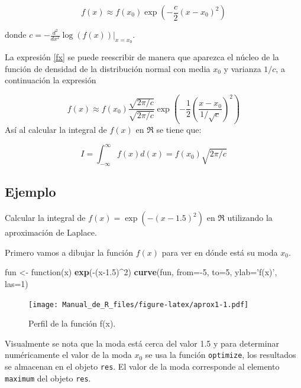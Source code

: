 \documentclass[10pt,]{krantz}
\makeatletter
\newenvironment{Shaded}{\begin{snugshade}}{\end{snugshade}}
\newcommand{\KeywordTok}[1]{\textcolor[rgb]{0.13,0.29,0.53}{\textbf{{#1}}}}
\newcommand{\DataTypeTok}[1]{\textcolor[rgb]{0.13,0.29,0.53}{{#1}}}
\newcommand{\DecValTok}[1]{\textcolor[rgb]{0.00,0.00,0.81}{{#1}}}
\newcommand{\FloatTok}[1]{\textcolor[rgb]{0.00,0.00,0.81}{{#1}}}
\newcommand{\StringTok}[1]{\textcolor[rgb]{0.31,0.60,0.02}{{#1}}}
\newcommand{\NormalTok}[1]{{#1}}
\newenvironment{kframe}{%
\medskip{}
\setlength{\fboxsep}{.8em}
 \def\at@end@of@kframe{}%
 \ifinner\ifhmode%
  \def\at@end@of@kframe{\end{minipage}}%
  \begin{minipage}{\columnwidth}%
 \fi\fi%
 \def\FrameCommand##1{\hskip\@totalleftmargin \hskip-\fboxsep
 \colorbox{shadecolor}{##1}\hskip-\fboxsep
     \hskip-\linewidth \hskip-\@totalleftmargin \hskip\columnwidth}%
 \MakeFramed {\advance\hsize-\width
   \@totalleftmargin\z@ \linewidth\hsize
   \@setminipage}}%
 {\par\unskip\endMakeFramed%
 \at@end@of@kframe}
\renewenvironment{Shaded}{\begin{kframe}}{\end{kframe}}
\makeatother
\begin{document}
\begin{equation} \label{fx}
f(x) \approx f(x_0)  \exp \left( -\frac{c}{2} (x-x_0)^2 \right)
\end{equation}

donde \(c=-\frac{d^2}{dx^2} \log(f(x)) \bigg|_{x=x_0}\).

La expresión \ref{fx} se puede reescribir de manera que aparezca el
núcleo de la función de densidad de la distribución normal con media
\(x_0\) y varianza \(1/c\), a continuación la expresión

\[
f(x) \approx f(x_0) \frac{\sqrt{2 \pi / c}}{\sqrt{2 \pi / c}}  \exp \left( -\frac{1}{2} \left( \frac{x-x_0}{1/\sqrt{c}} \right)^2 \right)
\] Así al calcular la integral de \(f(x)\) en \(\Re\) se tiene que:

\begin{equation} \label{aprox_laplace}
I = \int_{-\infty}^{\infty} f(x) d(x) = f(x_0) \sqrt{2 \pi / c}
\end{equation}

\subsection*{Ejemplo}\label{ejemplo-71}


Calcular la integral de \(f(x)=\exp \left( -(x-1.5)^2 \right)\) en
\(\Re\) utilizando la aproximación de Laplace.

Primero vamos a dibujar la función \(f(x)\) para ver en dónde está su
moda \(x_0\).

\begin{Shaded}
\begin{Highlighting}[]
\NormalTok{fun <-}\StringTok{ }\NormalTok{function(x) }\KeywordTok{exp}\NormalTok{(-(x}\FloatTok{-1.5}\NormalTok{)^}\DecValTok{2}\NormalTok{)}
\KeywordTok{curve}\NormalTok{(fun, }\DataTypeTok{from=}\NormalTok{-}\DecValTok{5}\NormalTok{, }\DataTypeTok{to=}\DecValTok{5}\NormalTok{, }\DataTypeTok{ylab=}\StringTok{'f(x)'}\NormalTok{, }\DataTypeTok{las=}\DecValTok{1}\NormalTok{)}
\end{Highlighting}
\end{Shaded}

\begin{figure}[htbp]
\centering
\texttt{[image: Manual\_de\_R\_files/figure-latex/aprox1-1.pdf]}
\caption{\label{fig:aprox1}Perfil de la función f(x).}
\end{figure}

Visualmente se nota que la moda está cerca del valor 1.5 y para
determinar numéricamente el valor de la moda \(x_0\) se usa la función
\texttt{optimize}, los resultados se almacenan en el objeto
\texttt{res}. El valor de la moda corresponde al elemento
\texttt{maximum} del objeto \texttt{res}.
\end{document}
